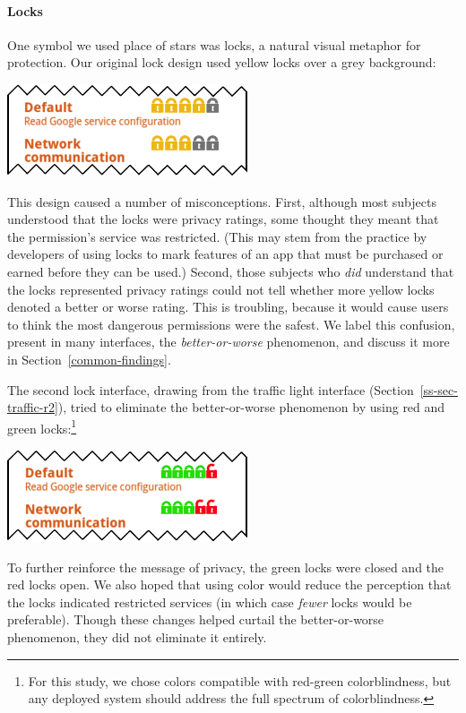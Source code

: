 \documentclass[11pt]{article}
\newcommand{\refsec}[1]{Section~\ref{#1}}
\begin{document}
\paragraph{Locks}
\label{s-sec-locks}

One symbol we used place of stars was locks, a natural visual metaphor for protection.
Our original lock design used yellow locks over a grey background:
\label{ss-sec-locks-r1}
\begin{center}
\includegraphics[width=.5\linewidth]{candidate-img/locks/locksR1.png}
\end{center}
This design caused a number of
misconceptions.
First, although most subjects understood that the locks were privacy 
ratings, some thought they meant that 
the permission's service was restricted. (This may 
stem from the practice by developers of using locks to mark features of 
an app that must be purchased or earned before they can be used.)
Second, those subjects who \emph{did} understand that the locks represented privacy ratings
could not tell whether more yellow locks denoted a better or worse 
rating. This is troubling, because it would cause users to think the most 
dangerous permissions were the safest. We label this confusion,
present in many interfaces, the 
\emph{better-or-worse} phenomenon, and discuss it more in \refsec{common-findings}.

The second lock interface, drawing from the traffic light interface
(\refsec{ss-sec-traffic-r2}), tried to eliminate the better-or-worse 
phenomenon by using red and green locks:\footnote{For this 
  study, we chose colors
  compatible with red-green colorblindness, but any deployed system
  should address the full spectrum of colorblindness.}
\label{ss-sec-locks-r2}
\begin{center}
\includegraphics[width=.5\linewidth]{candidate-img/locks/locksR2.png}
\end{center}
To further reinforce the message of privacy, the 
green locks were closed and the red locks open.
We also hoped that using color would reduce 
the perception that the locks indicated restricted services (in which 
case \emph{fewer} locks would be preferable).
Though these changes helped curtail the better-or-worse phenomenon, they did not 
eliminate it entirely. 
\end{document}
